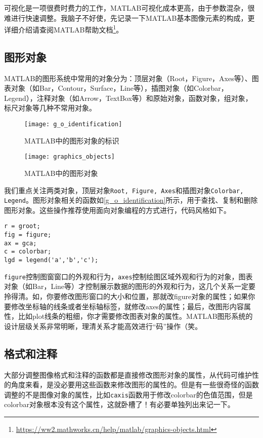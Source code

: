 可视化是一项很费时费力的工作，MATLAB可视化成本更高，由于参数混杂，很难进行快速调整。我脑子不好使，先记录一下MATLAB基本图像元素的构成，更详细介绍请查阅MATLAB帮助文档\footnote{\url{https://ww2.mathworks.cn/help/matlab/graphics-objects.html}}。

\subsection{图形对象}

MATLAB的图形系统中常用的对象分为：顶层对象（Root，Figure，Axes等）、图表对象（如Bar，Contour，Surface，Line等），插图对象（如Colorbar，Legend），注释对象（如Arrow，TextBox等）和原始对象，函数对象，组对象，标尺对象等几种不常用对象。

\begin{figure}
    \centering
    \texttt{[image: g\_o\_identification]}
    \caption{MATLAB中的图形对象的标识}
    \label{g_o_identification}
\end{figure}

\begin{figure}
    \centering
    \texttt{[image: graphics\_objects]}
    \caption{MATLAB中的图形对象}
\end{figure}

我们重点关注两类对象，顶层对象\texttt{Root, Figure, Axes}和插图对象\texttt{Colorbar, Legend}。图形对象相关的函数如\autoref{g_o_identification}所示，用于查找、复制和删除图形对象。这些操作推荐使用面向对象编程的方式进行，代码风格如下。

\begin{verbatim}
r = groot;
fig = figure;
ax = gca;
c = colorbar;
lgd = legend('a','b','c');
\end{verbatim}

\texttt{figure}控制图窗窗口的外观和行为，\texttt{axes}控制绘图区域外观和行为的对象，图表对象（如Bar，Line等）才控制展示数据的图形的外观和行为，这几个关系一定要拎得清。如，你要修改图形窗口的大小和位置，那就改figure对象的属性；如果你要修改坐标轴的线条或者坐标轴标签，就修改axes的属性；最后，改图形内容属性，比如plot线条的粗细，你才需要修改图表对象的属性。MATLAB图形系统的设计层级关系非常明晰，理清关系才能高效进行“码”操作（笑。

\subsection{格式和注释}

大部分调整图像格式和注释的函数都是直接修改图形对象的属性，从代码可维护性的角度来看，是没必要用这些函数来修改图形的属性的。但是有一些很奇怪的函数调整的不是图像对象的属性，比如\texttt{caxis}函数用于修改colorbar的色值范围，但是colorbar对象根本没有这个属性，这就卧槽了！有必要单独列出来记一下。

